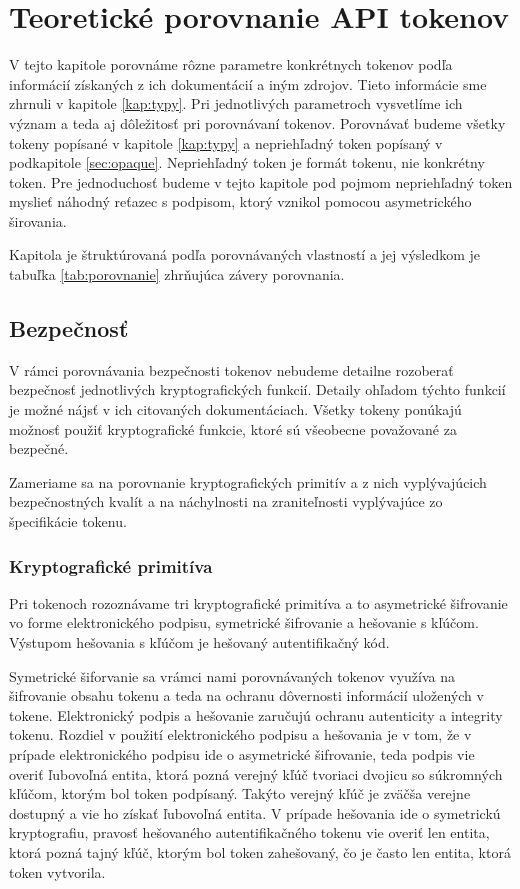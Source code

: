 \chapter{Teoretické porovnanie API tokenov}

\label{kap:teoreticke} %

V tejto kapitole porovnáme rôzne parametre konkrétnych tokenov podľa informácií získaných z ich dokumentácií a iným zdrojov. Tieto informácie sme zhrnuli v kapitole \ref{kap:typy}. Pri jednotlivých parametroch vysvetlíme ich význam a teda aj dôležitosť pri porovnávaní tokenov. Porovnávať budeme všetky tokeny popísané v kapitole \ref{kap:typy} a nepriehľadný token popísaný v podkapitole \ref{sec:opaque}. Nepriehľadný token je formát tokenu, nie konkrétny token. Pre jednoduchosť budeme v tejto kapitole pod pojmom nepriehľadný token myslieť náhodný reťazec s podpisom, ktorý vznikol pomocou asymetrického širovania. 

Kapitola je štruktúrovaná podľa porovnávaných vlastností a jej výsledkom je tabuľka \ref{tab:porovnanie} zhrňujúca závery porovnania.

\section{Bezpečnosť}

V rámci porovnávania bezpečnosti tokenov nebudeme detailne rozoberať bezpečnosť jednotlivých kryptografických funkcií. Detaily ohľadom týchto funkcií je možné nájsť v ich citovaných dokumentáciach. Všetky tokeny ponúkajú možnosť použiť kryptografické funkcie, ktoré sú všeobecne považované za bezpečné.

Zameriame sa na porovnanie kryptografických primitív a z nich vyplývajúcich bezpečnostných kvalít a na náchylnosti na zraniteľnosti vyplývajúce zo špecifikácie tokenu.

\subsection{Kryptografické primitíva}

Pri tokenoch rozoznávame tri kryptografické primitíva a to asymetrické šifrovanie vo forme elektronického podpisu, symetrické šifrovanie a hešovanie s kľúčom. Výstupom hešovania s kľúčom je hešovaný autentifikačný kód. 

Symetrické šiforvanie sa vrámci nami porovnávaných tokenov využíva na šifrovanie obsahu tokenu a teda na ochranu dôvernosti informácií uložených v tokene. Elektronický podpis a hešovanie zaručujú ochranu autenticity a integrity tokenu. Rozdiel v použití elektronického podpisu a hešovania je v tom, že v prípade elektronického podpisu ide o asymetrické šifrovanie, teda  podpis vie overiť ľubovoľná entita, ktorá pozná verejný kľúč tvoriaci dvojicu so súkromných kľúčom, ktorým bol token podpísaný. Takýto verejný kľúč je zväčša verejne dostupný a vie ho získať ľubovoľná entita. V prípade hešovania ide o symetrickú kryptografiu, pravosť hešovaného autentifikačného tokenu vie overiť len entita, ktorá pozná tajný kľúč, ktorým bol token zahešovaný, čo je často len entita, ktorá token vytvorila.

